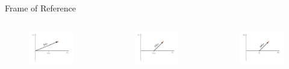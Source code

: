 \documentclass{beamer}
\begin{document}
\begin{frame}{Frame of Reference}
\begin{columns}
	\column[]{5cm}
	\vspace{-1cm}
	\begin{figure}
		\includegraphics[scale=2.2]{Pics/vspace_sc_trans.pdf}
	\end{figure}
	\vspace{-1.2cm}
	\begin{figure}
		\includegraphics[scale=2.2]{Pics/vspace_sw_trans.pdf}
	\end{figure}
	
	
	\column[]{6.2cm}
	\vspace{.5cm}
	\begin{figure}
		\includegraphics[scale=2.2]{Pics/wspace_sw_trans.pdf}
	\end{figure}
\end{columns}
\end{frame}


%
%
%
\end{document}
